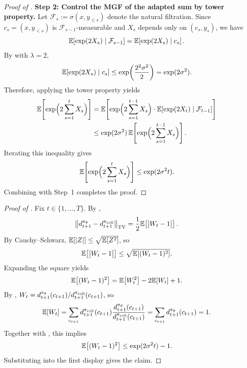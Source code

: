 \begin{proof}[Proof of ]
\smallskip
\noindent\textbf{Step 2: Control the MGF of the adapted sum by tower property.}
Let $\mathcal{F}_s:=\sigma(x,y_{\le s})$ denote the natural filtration.
Since $c_s=(x,y_{<s})$ is $\mathcal{F}_{s-1}$-measurable and $X_s$ depends only on $(c_s,y_s)$, we have
\begin{equation*}
    \mathbb{E}\!\left[\exp(2X_s)\mid \mathcal{F}_{s-1}\right]
    =
    \mathbb{E}\!\left[\exp(2X_s)\mid c_s\right].
\end{equation*}
By  with $\lambda=2$,
\begin{equation*}
    \mathbb{E}\!\left[\exp(2X_s)\mid c_s\right]
    \le \exp\!\left(\frac{2^2\sigma^2}{2}\right)
    = \exp(2\sigma^2).
\end{equation*}
Therefore, applying the tower property yields
\begin{align*}
    \mathbb{E}\!\left[\exp\!\Big(2\sum_{s=1}^{t}X_s\Big)\right]
    &=
    \mathbb{E}\!\left[
        \exp\!\Big(2\sum_{s=1}^{t-1}X_s\Big)\cdot \mathbb{E}\!\left[\exp(2X_t)\mid \mathcal{F}_{t-1}\right]
    \right]
    \\
    &\le
    \exp(2\sigma^2)\,\mathbb{E}\!\left[\exp\!\Big(2\sum_{s=1}^{t-1}X_s\Big)\right].
\end{align*}
Iterating this inequality gives
\begin{equation*}
    \mathbb{E}\!\left[\exp\!\Big(2\sum_{s=1}^{t}X_s\Big)\right]
    \le
    \exp(2\sigma^2 t).
\end{equation*}
Combining with Step~1 completes the proof.
\end{proof}

\begin{proof}[Proof of ]
Fix $t\in\{1,\ldots,T\}$. By ,
\begin{equation*}
    \bigl\|d_{t+1}^{\pi_{\theta}} - d_{t+1}^{\pi_{\mathrm{roll}}}\bigr\|_{\mathrm{TV}}
    =
    \frac{1}{2}\mathbb{E}\!\left[\bigl|W_t-1\bigr|\right].
\end{equation*}
By Cauchy--Schwarz, $\mathbb{E}[|Z|]\le \sqrt{\mathbb{E}[Z^2]}$, so
\begin{equation*}
    \mathbb{E}\!\left[\bigl|W_t-1\bigr|\right]
    \le
    \sqrt{\mathbb{E}\!\left[(W_t-1)^2\right]}.
\end{equation*}
Expanding the square yields
\begin{equation*}
    \mathbb{E}\!\left[(W_t-1)^2\right]
    =
    \mathbb{E}\!\left[W_t^2\right] - 2\mathbb{E}[W_t] + 1.
\end{equation*}
By , $W_t = d_{t+1}^{\pi_{\theta}}(c_{t+1})/d_{t+1}^{\pi_{\mathrm{roll}}}(c_{t+1})$, so
\begin{equation*}
    \mathbb{E}[W_t]
    =
    \sum_{c_{t+1}} d_{t+1}^{\pi_{\mathrm{roll}}}(c_{t+1})\frac{d_{t+1}^{\pi_{\theta}}(c_{t+1})}{d_{t+1}^{\pi_{\mathrm{roll}}}(c_{t+1})}
    =
    \sum_{c_{t+1}} d_{t+1}^{\pi_{\theta}}(c_{t+1})
    =
    1.
\end{equation*}
Together with , this implies
\begin{equation*}
    \mathbb{E}\!\left[(W_t-1)^2\right]
    \le \exp(2\sigma^2 t) - 1.
\end{equation*}
Substituting into the first display gives the claim.
\end{proof}

